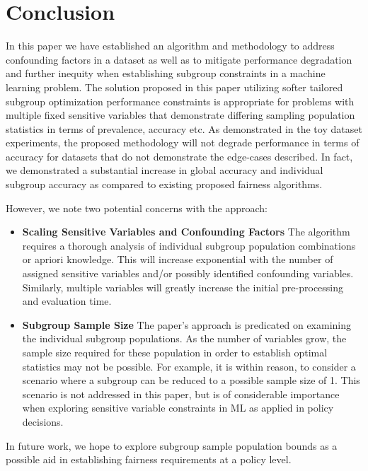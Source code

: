 \section{Conclusion}
	In this paper we have established an algorithm and methodology to address confounding factors in a dataset as well as to mitigate performance degradation and further inequity when establishing subgroup constraints in a machine learning problem.  The solution proposed in this paper utilizing softer tailored subgroup optimization performance constraints is appropriate for problems with multiple  fixed sensitive variables that demonstrate differing sampling population statistics in terms of prevalence, accuracy etc.  As demonstrated in the toy dataset experiments, the proposed methodology will not degrade performance in terms of accuracy for datasets that do not demonstrate the edge-cases described. In fact, we demonstrated a substantial increase in global accuracy and individual subgroup accuracy as compared to existing proposed fairness algorithms. \par
    
However, we note two potential concerns with the approach:
\begin{itemize}
	\item \textbf{Scaling Sensitive Variables and Confounding Factors}  The algorithm requires a thorough analysis of individual subgroup population combinations or apriori knowledge.  This will increase exponential with the number of assigned sensitive variables and/or possibly identified confounding variables.  Similarly, multiple variables will greatly increase the initial pre-processing and evaluation time.
 	\item \textbf{Subgroup Sample Size} The paper's approach is predicated on examining the individual subgroup populations. As the number of variables grow, the sample size  required for these population in order to establish optimal statistics may not be possible. For example, it is within reason, to consider a scenario where a subgroup can be reduced to a possible sample size of 1. This scenario is not addressed in this paper, but is of considerable importance when exploring sensitive variable constraints in ML as applied in policy decisions.  
\end{itemize}

In future work, we hope to explore subgroup sample population bounds as a possible aid in establishing fairness requirements at a policy level.

















